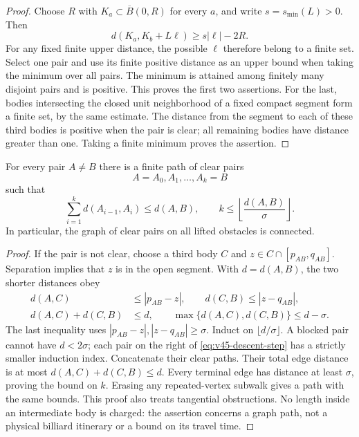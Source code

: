 \begin{proof}
Choose $R$ with $K_a\subset\overline B(0,R)$ for every $a$, and write
$s=s_{\min}(L)>0$.  Then
\begin{equation}\label{eq:v45-finite-label-bound}
 d(K_a,K_b+L\ell)\ge s|\ell|-2R.
\end{equation}
For any fixed finite upper distance, the possible $\ell$ therefore belong to
a finite set.  Select one pair and use its finite positive distance as an
upper bound when taking the minimum over all pairs.  The minimum is attained
among finitely many disjoint pairs and is positive.  This proves the first
two assertions.  For the last, bodies intersecting the closed unit
neighborhood of a fixed compact segment form a finite set, by the same
estimate.  The distance from the segment to each of these third bodies is
positive when the pair is clear; all remaining bodies have distance greater
than one.  Taking a finite minimum proves the assertion.
\end{proof}

\begin{lemma}
\label{lem:v45-obstruction-descent}
For every pair $A\ne B$ there is a finite path of clear pairs
\[
 A=A_0,A_1,\ldots,A_k=B
\]
such that
\begin{equation}\label{eq:v45-descent-budget}
 \sum_{i=1}^k d(A_{i-1},A_i)\le d(A,B),\qquad
 k\le\left\lfloor\frac{d(A,B)}{\sigma}\right\rfloor.
\end{equation}
In particular, the graph of clear pairs on all lifted obstacles is connected.
\end{lemma}

\begin{proof}
If the pair is not clear, choose a third body $C$ and
$z\in C\cap[p_{AB},q_{AB}]$.  Separation implies that $z$ is in the open
segment.  With $d=d(A,B)$, the two shorter distances obey
\begin{equation}\label{eq:v45-descent-step}
 \begin{split}
 d(A,C)&\le |p_{AB}-z|,\qquad d(C,B)\le|z-q_{AB}|,\\
 d(A,C)+d(C,B)&\le d,\qquad
 \max\{d(A,C),d(C,B)\}\le d-\sigma.
 \end{split}
\end{equation}
The last inequality uses $|p_{AB}-z|,|z-q_{AB}|\ge\sigma$.
Induct on $\lfloor d/\sigma\rfloor$.  A blocked pair cannot have
$d<2\sigma$; each pair on the right of \eqref{eq:v45-descent-step} has a
strictly smaller induction index.  Concatenate their clear paths.  Their
total edge distance is at most $d(A,C)+d(C,B)\le d$.  Every terminal edge
has distance at least $\sigma$, proving the bound on $k$.
Erasing any repeated-vertex subwalk gives a path with the same bounds.
This proof also treats tangential obstructions.  No length inside an
intermediate body is charged: the assertion concerns a graph path, not a
physical billiard itinerary or a bound on its travel time.
\end{proof}

